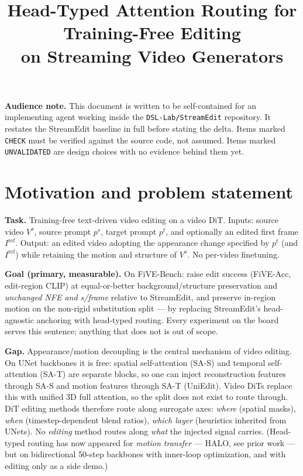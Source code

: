 \documentclass{article}
\title{Head-Typed Attention Routing for Training-Free Editing\\ on Streaming Video Generators}
\date{}
\begin{document}
\maketitle

\noindent\textbf{Audience note.} This document is written to be self-contained
for an implementing agent working inside the \texttt{DSL-Lab/StreamEdit}
repository. It restates the StreamEdit baseline in full before stating the
delta. Items marked \texttt{CHECK} must be verified against the source code, not
assumed. Items marked \texttt{UNVALIDATED} are design choices with no evidence
behind them yet.

\section{Motivation and problem statement}

\textbf{Task.} Training-free text-driven video editing on a video DiT. Inputs:
source video $V^{s}$, source prompt $p^{s}$, target prompt $p^{t}$, and
optionally an edited first frame $I^{\mathrm{ref}}$. Output: an edited video
adopting the appearance change specified by $p^{t}$ (and $I^{\mathrm{ref}}$)
while retaining the motion and structure of $V^{s}$. No per-video finetuning.

\textbf{Goal (primary, measurable).} On FiVE-Bench: raise edit success
(FiVE-Acc, edit-region CLIP) at equal-or-better background/structure
preservation and \emph{unchanged NFE and s/frame} relative to StreamEdit, and
preserve in-region motion on the non-rigid substitution split --- by replacing
StreamEdit's head-agnostic anchoring with head-typed routing. Every experiment
on the board serves this sentence; anything that does not is out of scope.

\textbf{Gap.} Appearance/motion decoupling is the central mechanism of video
editing. On UNet backbones it is free: spatial self-attention (SA-S) and
temporal self-attention (SA-T) are separate blocks, so one can inject
reconstruction features through SA-S and motion features through SA-T (UniEdit).
Video DiTs replace this with unified 3D full attention, so the split does not
exist to route through. DiT editing methods therefore route along surrogate
axes: \emph{where} (spatial masks), \emph{when} (timestep-dependent blend
ratios), \emph{which layer} (heuristics inherited from UNets). No \emph{editing} method routes along
\emph{what} the injected signal carries. (Head-typed routing has now appeared
for \emph{motion transfer} --- HALO, see prior work --- but on bidirectional
50-step backbones with inner-loop optimization, and with editing only as a
side demo.)
\end{document}
